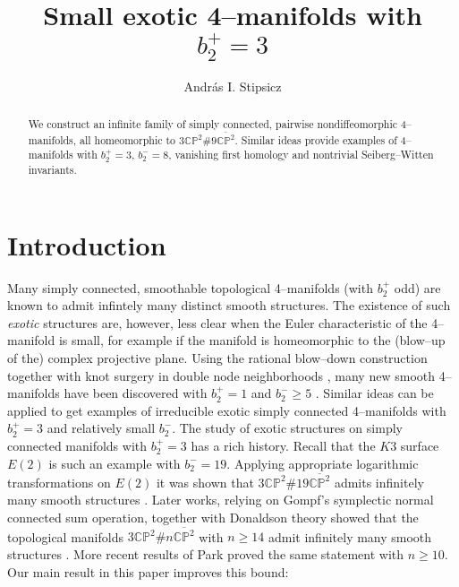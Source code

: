 \documentclass[11pt]{gtart}
\theoremstyle{definition}
\numberwithin{equation}{section}
\newcommand{\cpkk}{{\overline {{\mathbb C}{\mathbb P}^2}}}
\newcommand{\cpk}{{\mathbb {CP}}^2}
\begin{document}
\title{ Small exotic 4--manifolds with $b_2^+=3$}

\author{Andr\'{a}s I. Stipsicz}
\address{R\'enyi Institute of Mathematics\\
Hungarian Academy of Sciences\\
H-1053 Budapest\\ 
Re\'altanoda utca 13--15, Hungary and\\
Institute for Advanced Study, Princeton, NJ}




\begin{abstract}
We construct an infinite  family of simply connected,
pairwise nondiffeomorphic  4--manifolds,
all homeomorphic to $3\cpk \# 9 \cpkk$. 
Similar ideas provide examples of 4--manifolds  with $b_2^+=3$,
$b_2^-=8$, vanishing first homology and nontrivial Seiberg--Witten
invariants.
\end{abstract}

\maketitle

\section{Introduction}
Many simply connected, smoothable topological 4--manifolds (with
$b_2^+$ odd) are known to admit infintely many distinct smooth
structures. The existence of such \emph{exotic} structures are,
however, less clear when the Euler characteristic of the 4--manifold
is small, for example if the manifold is homeomorphic to the (blow--up
of the) complex projective plane. Using the rational blow--down
construction \cite{FS1} together with knot surgery \cite{FSknot} in
double node neighborhoods \cite{FSuj}, many new smooth 4--manifolds
have been discovered with $b_2^+=1$ and $b_2^-\geq 5$ \cite{FSuj, P,
PSS, SS}. Similar ideas can be applied to get examples of irreducible
exotic simply connected 4--manifolds with $b_2^+=3$ and relatively
small $b_2^-$.  The study of exotic structures on simply connected
manifolds with $b_2^+=3$ has a rich history. Recall that the $K3$
surface $E(2)$ is such an example with $b_2^-=19$. Applying
appropriate logarithmic transformations on $E(2)$ it was shown that
$3\cpk \# 19 \cpkk$ admits infinitely many smooth structures
\cite{FMbook, MO, SSz}. Later works, relying on Gompf's symplectic
normal connected sum operation, together with Donaldson theory showed
that the topological manifolds $3\cpk \# n \cpkk$ with $n\geq 14$
admit infinitely many smooth structures \cite{Screll, Sztop}. More
recent results of Park \cite{Doug1, Doug2, Doug3} proved the same
statement with $n\geq 10$. Our main result in this paper improves this
bound:
\end{document}
